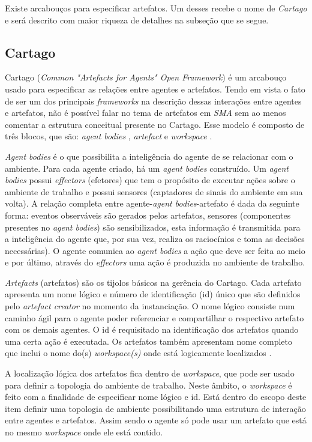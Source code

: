 Existe arcabouços para especificar artefatos. Um desses recebe o nome de \textit{Cartago} e será descrito com maior riqueza de detalhes na subseção que se segue.
 
 \subsection{Cartago}

Cartago (\textit{Common "Artefacts for Agents" Open Framework}) é um arcabouço usado para especificar as relações entre agentes e artefatos. Tendo em vista o fato de ser um dos principais \textit{frameworks} na descrição dessas interações entre agentes e artefatos, não é possível falar no tema de artefatos em \textit{SMA} sem ao menos comentar a estrutura conceitual presente no Cartago. Esse modelo é composto de três blocos, que são: \textit{agent bodies} , \textit{artefact} e \textit{workspace} \cite{cartago}.

 \textit{Agent bodies} é  o que possibilita a inteligência do agente de se relacionar com o ambiente. Para cada agente criado, há um \textit{agent bodies} construído. Um \textit{agent bodies} possui \textit{effectors} (efetores) que tem o propósito de executar ações sobre o ambiente de trabalho e possui sensores (captadores de sinais do ambiente em sua volta). A relação completa entre agente-\textit{agent bodies}-artefato é dada da seguinte forma: eventos observáveis são gerados pelos artefatos, sensores (componentes presentes no \textit{agent bodies}) são sensibilizados, esta informação é transmitida para a inteligência do  agente que, por sua vez, realiza os raciocínios e toma as decisões necessárias). O agente comunica ao \textit{agent bodies} a ação que deve ser feita ao meio e por último, através do \textit{effectors} uma ação é produzida no ambiente de trabalho. 

 \textit{Artefacts} (artefatos) são os tijolos básicos na gerência do Cartago. Cada artefato apresenta um nome lógico e número de identificação (id) único que são definidos pelo \textit{artefact creator} no momento da instanciação. O nome lógico consiste num caminho ágil para o agente poder referenciar  e compartilhar o respectivo artefato com os demais agentes. O id é requisitado na identificação dos artefatos quando uma certa ação é executada. Os artefatos também apresentam nome completo que inclui o nome do(s) \textit{workspace(s)} onde está logicamente localizados \cite{cartago}.

 A localização lógica dos artefatos fica dentro de \textit{workspace}, que pode ser usado para definir a topologia do ambiente de trabalho. Neste âmbito, o \textit{workspace} é feito com a finalidade de especificar nome lógico e id. Está dentro do escopo deste item definir uma topologia de ambiente possibilitando uma estrutura de interação entre agentes e artefatos. Assim sendo o agente só pode usar um artefato que está no mesmo \textit{workspace} onde ele está contido. 